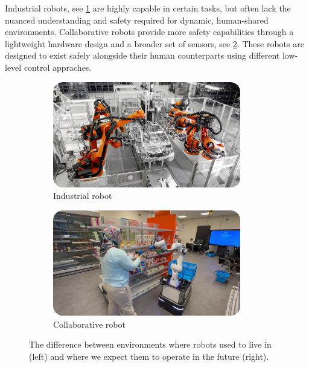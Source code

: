 Industrial robots, see \cref{fig:industrial_robot}
are highly capable in certain tasks, but
often lack the nuanced understanding and safety required for
dynamic, human-shared environments. Collaborative robots
provide more safety capabilities through a lightweight
hardware design and a broader set of sensors, see
\cref{fig:collaborative_robot}. These
robots are designed to exist safely alongside their human
counterparts using different low-level control appraches.

\begin{figure}
  \centering
  \begin{subfigure}{0.5\textwidth}
    \centering
    \includegraphics[width=0.9\textwidth]{src/introduction/img/industrial_robot.png}
    \caption{Industrial robot}
    \label{fig:industrial_robot}
  \end{subfigure}%
  \begin{subfigure}{0.5\textwidth}
    \centering
    \includegraphics[width=0.9\textwidth]{src/introduction/img/collaborative_robot.png}
    \caption{Collaborative robot}
    \label{fig:collaborative_robot}
  \end{subfigure}
  \caption{The difference between environments where robots
  used to live in (left) and where we expect them to operate
  in the future (right).}
  \label{fig:different_robots}
\end{figure}

